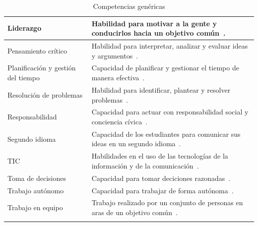 \begin{landscape}
\begin{center}
\begin{longtable}{| m{6cm} | m{16cm} |}
    \hline
    Liderazgo & Habilidad para motivar a la gente y conducirlos hacia un objetivo común~\cite{gonzalez2003tuning}. \\
    \hline
    Pensamiento crítico & Habilidad para interpretar, analizar y evaluar ideas y argumentos~\cite{fisher2011critical}. \\
    \hline
    Planificación y gestión del tiempo & Capacidad de planificar y gestionar el tiempo de manera efectiva~\cite{gonzalez2003tuning}. \\
    \hline
    Resolución de problemas & Habilidad para identificar, plantear y resolver problemas~\cite{gonzalez2003tuning}. \\
    \hline
    Responsabilidad & Capacidad para actuar con responsabilidad social y conciencia cívica~\cite{gonzalez2003tuning}. \\
    \hline 
    Segundo idioma & Capacidad de los estudiantes para comunicar sus ideas en un segundo idioma~\cite{gass2013second}. \\
    \hline
    TIC & Habilidades en el uso de las tecnologías de la información y de la comunicación~\cite{gonzalez2003tuning}. \\
    \hline
    Toma de decisiones & Capacidad para tomar deciciones razonadas~\cite{gonzalez2003tuning}. \\
    \hline
    Trabajo autónomo & Capacidad para trabajar de forma autónoma~\cite{gonzalez2003tuning}. \\
    \hline
    Trabajo en equipo & Trabajo realizado por un conjunto de personas en aras de un objetivo común~\cite{parker1990teamwork}. \\
    \hline
\caption{Competencias genéricas}
\label{tab:CompetenciasGenericas}
\end{longtable} 
\end{center}
\end{landscape}
\pagestyle{fancy}

